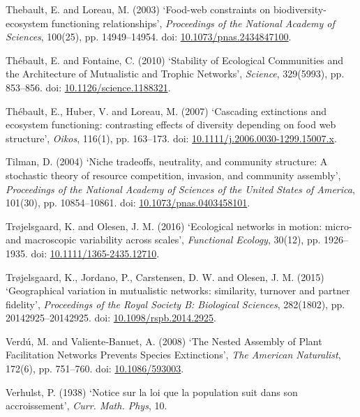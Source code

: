 \documentclass[12pt]{article}
\begin{document}
\hypertarget{ref-theb03fcb}{}
Thebault, E. and Loreau, M. (2003) `Food-web constraints on
biodiversity-ecosystem functioning relationships', \emph{Proceedings of
the National Academy of Sciences}, 100(25), pp. 14949--14954. doi:
\href{https://doi.org/10.1073/pnas.2434847100}{10.1073/pnas.2434847100}.

\hypertarget{ref-theb10sec}{}
Thébault, E. and Fontaine, C. (2010) `Stability of Ecological
Communities and the Architecture of Mutualistic and Trophic Networks',
\emph{Science}, 329(5993), pp. 853--856. doi:
\href{https://doi.org/10.1126/science.1188321}{10.1126/science.1188321}.

\hypertarget{ref-theb07cee}{}
Thébault, E., Huber, V. and Loreau, M. (2007) `Cascading extinctions and
ecosystem functioning: contrasting effects of diversity depending on
food web structure', \emph{Oikos}, 116(1), pp. 163--173. doi:
\href{https://doi.org/10.1111/j.2006.0030-1299.15007.x}{10.1111/j.2006.0030-1299.15007.x}.

\hypertarget{ref-tilm04ntn}{}
Tilman, D. (2004) `Niche tradeoffs, neutrality, and community structure:
A stochastic theory of resource competition, invasion, and community
assembly', \emph{Proceedings of the National Academy of Sciences of the
United States of America}, 101(30), pp. 10854--10861. doi:
\href{https://doi.org/10.1073/pnas.0403458101}{10.1073/pnas.0403458101}.

\hypertarget{ref-troj16enm}{}
Trøjelsgaard, K. and Olesen, J. M. (2016) `Ecological networks in
motion: micro- and macroscopic variability across scales',
\emph{Functional Ecology}, 30(12), pp. 1926--1935. doi:
\href{https://doi.org/10.1111/1365-2435.12710}{10.1111/1365-2435.12710}.

\hypertarget{ref-troj15gvm}{}
Trøjelsgaard, K., Jordano, P., Carstensen, D. W. and Olesen, J. M.
(2015) `Geographical variation in mutualistic networks: similarity,
turnover and partner fidelity', \emph{Proceedings of the Royal Society
B: Biological Sciences}, 282(1802), pp. 20142925--20142925. doi:
\href{https://doi.org/10.1098/rspb.2014.2925}{10.1098/rspb.2014.2925}.

\hypertarget{ref-verd08nap}{}
Verdú, M. and Valiente‐Banuet, A. (2008) `The Nested Assembly of Plant
Facilitation Networks Prevents Species Extinctions', \emph{The American
Naturalist}, 172(6), pp. 751--760. doi:
\href{https://doi.org/10.1086/593003}{10.1086/593003}.

\hypertarget{ref-verh38nlq}{}
Verhulst, P. (1938) `Notice sur la loi que la population suit dans son
accroissement', \emph{Curr. Math. Phys}, 10.
\end{document}
